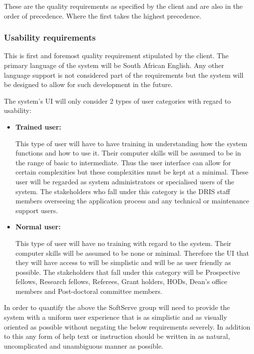 These are the quality requirements as specified by the client and are also in the order of precedence. Where the first takes the highest precedence.

\subsubsection{Usability requirements}

\begin{flushleft}

This is first and foremost quality requirement stipulated by the client. The primary language of the system will be South African English. Any other language support is not considered part of the requirements but the system will be designed to allow for such development in the future.\\

\vspace{0.1in}

The system's UI will only consider 2 types of user categories with regard to usability:

\begin{itemize}

\item\textbf{Trained user:}

This type of user will have to have training in understanding how the system functions and how to use it. Their computer skills will be assumed to be in the range of basic to intermediate. Thus the user interface can allow for certain complexities but these complexities must be kept at a minimal. These user will be regarded as system administrators or specialised users of the system. The stakeholders who fall under this category is the DRIS staff members overseeing the application process and any technical or maintenance support users.

\item\textbf{Normal user:}

This type of user will have no training with regard to the system. Their computer skills will be assumed to be none or minimal. Therefore the UI that they will have access to will be simplistic and will be as user friendly as possible. The stakeholders that fall under this category will be Prospective fellows, Research fellows, Referees, Grant holders, HODs, Dean's office members and Post-doctoral committee members.

\end{itemize}

In order to quantify the above the SoftServe group will need to provide the system with a uniform user experience that is as simplistic and as visually oriented as possible without negating the below requirements severely. In addition to this any form of help text or instruction should be written in as natural, uncomplicated and unambiguous manner as possible. 

\end{flushleft}

